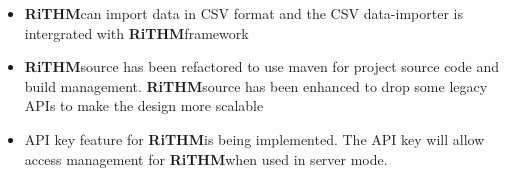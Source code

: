 \documentclass[]{article}
\newcommand{\rithm}{\textbf{RiTHM}\space}
\begin{document}
\begin{itemize}
	\begin{lstlisting}
	java rithm.driver.RiTHMBrewer 
	-specFile=/home/y2joshi/InputFiles/specsQnx 
	-dataFile=/home/y2joshi/Input1.csv
	-outputFile=/home/y2joshi/InputFiles/output3.html 
	-monitorClass=LTL4 
	-traceParserClass=CSV 
	-specParserClass=LTL
	\end{lstlisting}
	Similarly, \rithm's another instance can be started to monitor using Verbose LTL (using 4-valued semantics), and it uses trace data in XML format 
	\begin{lstlisting}
	java rithm.driver.RiTHMBrewer 
	-specFile=/home/y2joshi/InputFiles/specsQnx 
	-dataFile=/home/y2joshi/Input1.XML
	-outputFile=/home/y2joshi/InputFiles/output3.html 
	-monitorClass=LTL4 
	-traceParserClass=CSV 
	-specParserClass=VLTL
	\end{lstlisting}
	\item \rithm can import data in CSV format and the CSV data-importer is intergrated with \rithm framework
	
	\item
	\rithm source has been refactored to use maven for project source code and build management. \rithm source has been enhanced to drop some legacy APIs to make the design more scalable
	
	\item API key feature for \rithm is being implemented. The API key will allow access management for \rithm when used in server mode.
	\end{itemize}

	
	\nocite{*}
	

	
\end{document}
